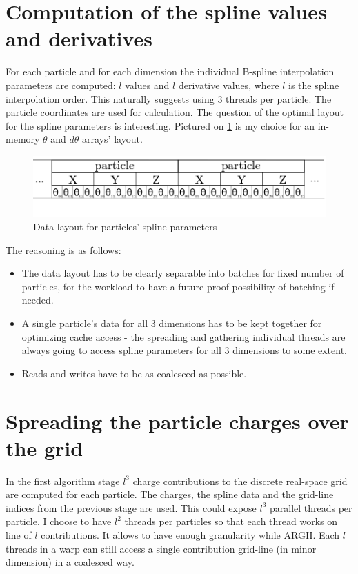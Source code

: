 \documentclass[12pt,a4paper]{report}
\newcommand{\draft}[1]{#1}
\begin{document}
\section{Computation of the spline values and derivatives}
For each particle and for each dimension the individual B-spline interpolation parameters are computed: $l$ values and $l$ derivative values, where $l$ is the spline interpolation order. This naturally suggests using 3 threads per particle. The particle coordinates are used for calculation.
The question of the optimal layout for the spline parameters is interesting. Pictured on \ref{fig:spline} is my choice for an in-memory $\theta$ and $d\theta$ arrays' layout. 
\FloatBarrier
\begin{figure}[h!]
    \centering
    \includegraphics[width=1\textwidth]{pics/theta.png}
    \caption{Data layout for particles' spline parameters}
    \label{fig:spline}
\end{figure}
\FloatBarrier
The reasoning is as follows:
\begin{itemize}
\item The data layout has to be clearly separable into batches for fixed number of particles, for the workload to have a future-proof possibility of batching if needed.
\item A single particle's data for all 3 dimensions has to be kept together for optimizing cache access - the spreading and gathering individual threads are always going to access spline parameters for all 3 dimensions to some extent. 
\item Reads and writes have to be as coalesced as possible.
\end{itemize}

\section{Spreading the particle charges over the grid}
In the first algorithm stage $l^3$ charge contributions to the discrete real-space grid are computed for each particle. The charges, the spline data and the grid-line indices from the previous stage are used.
This could expose $l^3$ parallel threads per particle. I choose to have $l^2$ threads per particles so that each thread works on line of $l$ contributions. It allows to have enough granularity while \draft{ARGH}.
Each $l$ threads in a warp can still access a single contribution grid-line (in minor dimension) in a coalesced way. 
\end{document}
